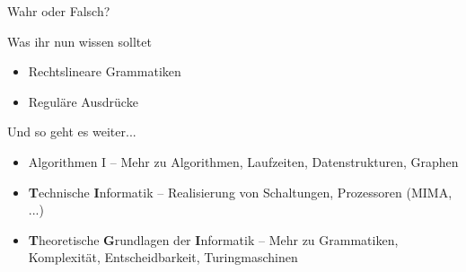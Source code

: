 







\begin{frame}[t]{Wahr oder Falsch?}
\end{frame}



\def\abbrsize{\footnotesize}
\begin{frame}	
	\begin{block}{Was ihr nun wissen solltet}
		\begin{itemize}
			\item Rechtslineare Grammatiken
			\item Reguläre Ausdrücke
		\end{itemize}
	\end{block}
	
	\begin{block}{Und so geht es weiter...}
		\vspace{-.3\baselineskip}
		\begin{itemize}
			\item Algorithmen I -- Mehr zu Algorithmen, Laufzeiten, Datenstrukturen, Graphen
			\item \textbf{T}{\abbrsize echnische} \textbf{I}{\abbrsize nformatik} -- Realisierung von Schaltungen, Prozessoren (MIMA, ...)
			\item \textbf{T}{\abbrsize heoretische} \textbf{G}{\abbrsize rundlagen der} \textbf{I}{\abbrsize nformatik} -- Mehr zu Grammatiken, Komplexität, Entscheidbarkeit, Turingmaschinen
		\end{itemize}
	\end{block}
\end{frame}

